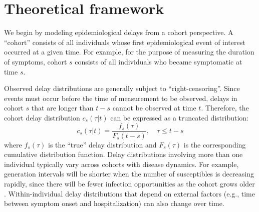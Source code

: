 \documentclass[12pt]{article}
\begin{document}
\section{Theoretical framework}

We begin by modeling epidemiological delays from a cohort perspective.
A ``cohort'' consists of all individuals whose first epidemiological event of interest occurred at a given time.
For example, for the purpose of measuring the duration of symptoms, cohort $s$ consists of all individuals who became symptomatic at time $s$.

Observed delay distributions are generally subject to ``right-censoring''.
Since events must occur before the time of measurement to be observed, delays in cohort $s$ that are longer than $t-s$ cannot be observed at time $t$.
Therefore, the cohort delay distribution $c_s(\tau|t)$ can be expressed as a truncated distribution:
\begin{equation}
c_s(\tau|t) = \frac{f_s(\tau)}{F_s(t-s)},\quad \tau \leq t-s
\end{equation}
where $f_s(\tau)$ is the ``true'' delay distribution and $F_s(\tau)$ is the corresponding cumulative distribution function.
Delay distributions involving more than one individual typically vary across cohorts with disease dynamics. For example, generation intervals will be shorter when the number of susceptibles is decreasing rapidly, since there will be fewer infection opportunities as the cohort grows older \citep{champredon2015intrinsic}.
Within-individual delay distributions that depend on external factors (e.g., time between symptom onset and hospitalization) can also change over time.
\end{document}
